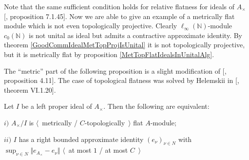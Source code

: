 Note that the same sufficient condition holds for relative flatness for ideals of $A_\times$ [\cite{HelBanLocConvAlg}, proposition 7.1.45]. Now we are able to give an example of a metrically flat module which is not even topologically projective. Clearly $\ell_\infty(\mathbb{N})$-module $c_0(\mathbb{N})$ is not unital as ideal but admits a contractive approximate identity. By theorem \ref{GoodCommIdealMetTopProjIsUnital} it is not topologically projective, but it is metrically flat by proposition \ref{MetTopFlatIdealsInUnitalAlg}.

The ``metric'' part of the following proposition is a slight modification of [\cite{WhiteInjmoduAlg}, proposition 4.11]. The case of topological flatness was solved by Helemskii in [\cite{HelHomolBanTopAlg}, theorem VI.1.20].

\begin{proposition}\label{MetTopFlatCycModCharac} Let $I$ be a left proper ideal of $A_\times $. Then the following are equivalent:

$i)$ $A_\times /I$ is $\langle$~metrically / $C$-topologically~$\rangle$ flat $A$-module;

$ii)$ $I$ has a right bounded approximate identity $(e_\nu)_{\nu\in N}$ with $\sup_{\nu\in N}\Vert e_{A_\times }-e_\nu\Vert$ $\langle$~at most $1$ / at most $C$~$\rangle$
\end{proposition}

